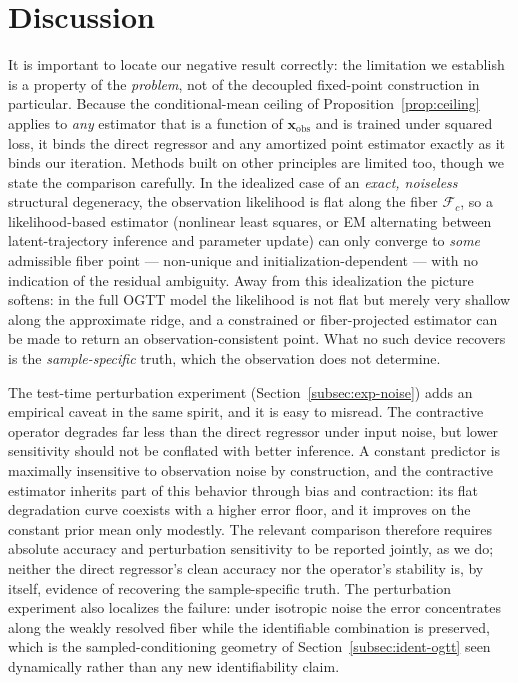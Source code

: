 \section{Discussion}
\label{sec:discussion}

It is important to locate our negative result correctly: the limitation we establish is a property of the \emph{problem}, not of the decoupled fixed-point construction in particular. Because the conditional-mean ceiling of Proposition~\ref{prop:ceiling} applies to \emph{any} estimator that is a function of $\mathbf{x}_\mathrm{obs}$ and is trained under squared loss, it binds the direct regressor and any amortized point estimator exactly as it binds our iteration. Methods built on other principles are limited too, though we state the comparison carefully. In the idealized case of an \emph{exact, noiseless} structural degeneracy, the observation likelihood is flat along the fiber $\mathcal{F}_c$, so a likelihood-based estimator (nonlinear least squares, or EM alternating between latent-trajectory inference and parameter update) can only converge to \emph{some} admissible fiber point --- non-unique and initialization-dependent --- with no indication of the residual ambiguity. Away from this idealization the picture softens: in the full OGTT model the likelihood is not flat but merely very shallow along the approximate ridge, and a constrained or fiber-projected estimator can be made to return an observation-consistent point. What no such device recovers is the \emph{sample-specific} truth, which the observation does not determine.

The test-time perturbation experiment (Section~\ref{subsec:exp-noise}) adds an empirical caveat in the same
spirit, and it is easy to misread. The contractive operator degrades far less than the direct regressor under
input noise, but lower sensitivity should not be conflated with better inference. A constant predictor is
maximally insensitive to observation noise by construction, and the contractive estimator inherits part of
this behavior through bias and contraction: its flat degradation curve coexists with a higher error floor,
and it improves on the constant prior mean only modestly. The relevant comparison therefore requires
absolute accuracy and perturbation sensitivity to be reported jointly, as we do; neither the direct
regressor's clean accuracy nor the operator's stability is, by itself, evidence of recovering the
sample-specific truth. The perturbation experiment also localizes the failure: under isotropic noise the
error concentrates along the weakly resolved fiber while the identifiable combination is preserved, which is
the sampled-conditioning geometry of Section~\ref{subsec:ident-ogtt} seen dynamically rather than any new
identifiability claim.

